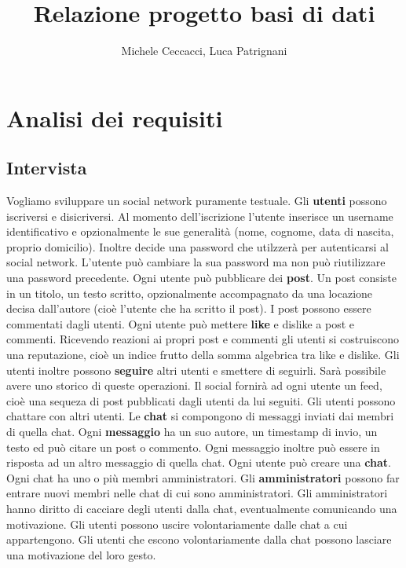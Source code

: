 \documentclass[a4paper,12pt]{report}
\begin{document}
\title{Relazione progetto basi di dati}
\author{Michele Ceccacci, Luca Patrignani}
\maketitle
\tableofcontents

\chapter{Analisi dei requisiti}
\section{Intervista}
Vogliamo sviluppare un social network puramente testuale.
Gli \textbf{utenti} possono iscriversi e disicriversi. Al momento dell'iscrizione l'utente inserisce un username identificativo e opzionalmente le sue generalità (nome, cognome, data di nascita, proprio domicilio). Inoltre decide una password che utilzzerà per autenticarsi al social network.
L'utente può cambiare la sua password ma non può riutilizzare una password precedente.
Ogni utente può pubblicare dei \textbf{post}. Un post consiste in un titolo, un testo scritto, opzionalmente accompagnato da una locazione decisa dall'autore (cioè l'utente che ha scritto il post). 
I post possono essere commentati dagli utenti.
Ogni utente può mettere \textbf{like} e dislike a post e commenti. Ricevendo reazioni ai propri post e commenti gli utenti si costruiscono una reputazione, cioè un indice frutto della somma algebrica tra like e dislike.
Gli utenti inoltre possono \textbf{seguire} altri utenti e smettere di seguirli. Sarà possibile avere uno storico di queste operazioni. 
Il social fornirà ad ogni utente un feed, cioè una sequeza di post pubblicati dagli utenti da lui seguiti.
Gli utenti possono chattare con altri utenti. Le \textbf{chat} si compongono di messaggi inviati dai membri di quella chat. Ogni \textbf{messaggio} ha un suo autore, un timestamp di invio, un testo ed può citare un post o commento. Ogni messaggio inoltre può essere in risposta ad un altro messaggio di quella chat. 
Ogni utente può creare una \textbf{chat}. Ogni chat ha uno o più membri amministratori. Gli \textbf{amministratori} possono far entrare nuovi membri nelle chat di cui sono amministratori. Gli amministratori hanno diritto di cacciare degli utenti dalla chat, eventualmente comunicando una motivazione. Gli utenti possono uscire volontariamente dalle chat a cui appartengono. Gli utenti che escono volontariamente dalla chat possono lasciare una motivazione del loro gesto. 
\end{document}
